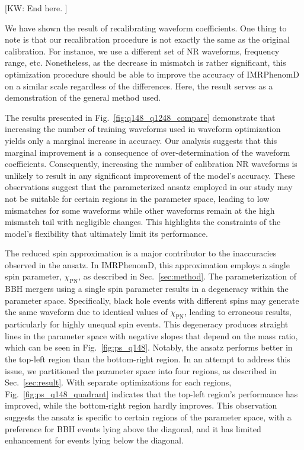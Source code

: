 \documentclass[twocolumn]{aastex631}
\newcommand{\kw}[1]{{\color{rb4}[KW: #1 ]}}
\begin{document}
\kw{End here.}

We have shown the result of recalibrating waveform coefficients. One thing to
note is that our recalibration procedure is not exactly the same as the original
calibration. For instance, we use a different set of NR waveforms, frequency
range, etc. Nonetheless, as the decrease in mismatch is rather significant, this
optimization procedure should be able to improve the accuracy of IMRPhenomD on a
similar scale regardless of the differences. Here, the result serves as a
demonstration of the general method used.  

The results presented in Fig.~\ref{fig:q148_q1248_compare} demonstrate that
increasing the number of training waveforms used in waveform optimization yields
only a marginal increase in accuracy. Our analysis suggests that this marginal
improvement is a consequence of over-determination of the waveform coefficients.
Consequently, increasing the number of calibration NR waveforms is unlikely to
result in any significant improvement of the model's accuracy. These
observations suggest that the parameterized ansatz employed in our study may not
be suitable for certain regions in the parameter space, leading to low mismatches
for some waveforms while other waveforms remain at the high mismatch tail with
negligible changes. This highlights the constraints of the model's flexibility
that ultimately limit its performance.

The reduced spin approximation is a major contributor to the inaccuracies
observed in the ansatz. In IMRPhenomD, this approximation employs a single spin
parameter, $\chi_{\mathrm{PN}}$, as described in Sec.~\ref{sec:method}. The
parameterization of BBH mergers using a single spin parameter results in a
degeneracy within the parameter space. Specifically, black hole events with
different spins may generate the same waveform due to identical values of
$\chi_{\mathrm{PN}}$, leading to erroneous results, particularly for highly
unequal spin events. This degeneracy produces straight lines in the parameter
space with negative slopes that depend on the mass ratio, which can be seen in 
Fig.~\ref{fig:ps_q148}. Notably, the ansatz performs better in the top-left
region than the bottom-right region. In an attempt to address
this issue, we partitioned the parameter space into four regions, as described
in Sec.~\ref{sec:result}. With separate optimizations for each
regions, Fig.~\ref{fig:ps_q148_quadrant} indicates that the top-left region's 
performance has improved, while the bottom-right region hardly improves. 
This observation suggests the ansatz is specific to certain regions of the 
parameter space, with a preference for BBH events lying above the diagonal, 
and it has limited enhancement for events lying below the diagonal. 
\end{document}

